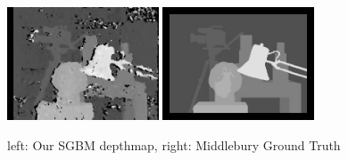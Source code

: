 \documentclass[a4paper]{article}
\begin{document}
\begin{figure} [h!tb]
  \centering
  \includegraphics[width=0.4\textwidth]{sgbm_tsukuba_own}
  \includegraphics[width=0.4\textwidth]{disp_tsukuba_orig}
  \caption{left: Our SGBM depthmap, right: Middlebury Ground Truth}
  \label{sgbm_comp}
\end{figure}
\end{document}
